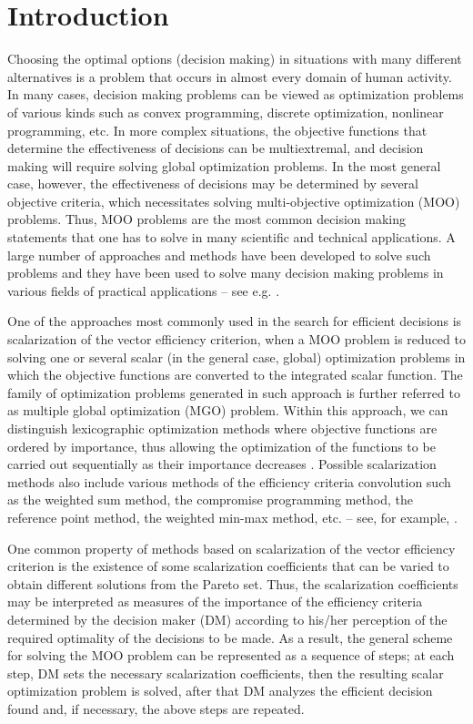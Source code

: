 \documentclass[runningheads]{llncs}
\begin{document}
\section{Introduction} \label{sec:01}


Choosing the optimal options (decision making) in situations with many different alternatives is a problem that occurs in almost every domain of human activity. In many cases, decision making problems can be viewed as optimization problems of various kinds such as convex programming, discrete optimization, nonlinear programming, etc. In more complex situations, the objective functions that determine the effectiveness of decisions can be multiextremal, and decision making will require solving global optimization problems. In the most general case, however, the effectiveness of decisions may be determined by several objective criteria, which necessitates solving multi-objective optimization (MOO) problems. Thus, MOO problems are the most common decision making statements that one has to solve in many scientific and technical applications. A large number of approaches and methods have been developed to solve such problems and they have been used to solve many decision making problems in various fields of practical applications -- see e.g. \cite{c1,c2,c3,c4,c5,c6,c7,c8,c9}.

One of the approaches most commonly used in the search for efficient decisions is scalarization of the vector efficiency criterion, when a MOO problem is reduced to solving one or several scalar (in the general case, global) optimization problems in which the objective functions are converted to the integrated scalar function. The family of optimization problems generated in such approach is further referred to as multiple global optimization (MGO) problem. Within this approach, we can distinguish lexicographic optimization methods where objective functions are ordered by importance, thus  allowing the optimization of the functions to be carried out sequentially as their importance decreases \cite{c10}. Possible scalarization methods also include various methods of the efficiency criteria convolution such as the weighted sum method, the compromise programming method, the reference point method, the weighted min-max method, etc. -- see, for example, \cite{c2,c11,c12}. 

One common property of methods based on scalarization of the vector efficiency criterion is the existence of some scalarization coefficients that can be varied to obtain different solutions from the Pareto set. Thus, the scalarization coefficients may be interpreted as measures of the importance of the efficiency criteria determined by the decision maker (DM) according to his/her perception of the required optimality of the decisions to be made. As a result, the general scheme for solving the MOO problem can be represented as a sequence of steps; at each step, DM sets the necessary scalarization coefficients, then the resulting scalar optimization problem is solved, after that DM analyzes the efficient decision found and, if necessary, the above steps are repeated.
\end{document}
